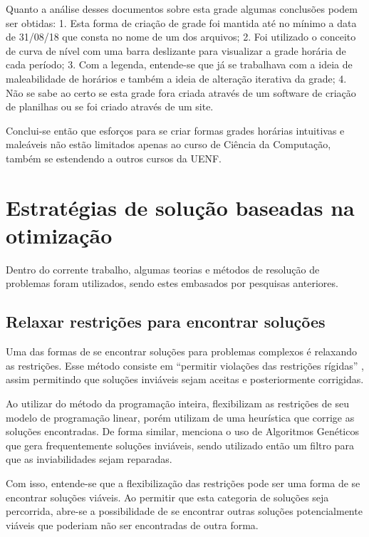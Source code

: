 Quanto a análise desses documentos sobre esta grade algumas conclusões podem ser obtidas: 1. Esta forma de criação de grade foi mantida até no mínimo a data de 31/08/18 que consta no nome de um dos arquivos; 2. Foi utilizado o conceito de curva de nível com uma barra deslizante para visualizar a grade horária de cada período; 3. Com a legenda, entende-se que já se trabalhava com a ideia de maleabilidade de horários e também a ideia de alteração iterativa da grade; 4. Não se sabe ao certo se esta grade fora criada através de um software de criação de planilhas ou se foi criado através de um site.

Conclui-se então que esforços para se criar formas grades horárias intuitivas e maleáveis não estão limitados apenas ao curso de Ciência da Computação, também se estendendo a outros cursos da UENF.

\section{Estratégias de solução baseadas na otimização} \label{sec:teorias}                               %

Dentro do corrente trabalho, algumas teorias e métodos de resolução de problemas foram utilizados, sendo estes embasados por pesquisas anteriores.

\subsection{Relaxar restrições para encontrar soluções} \label{ssec:relaxar}                              %

Uma das formas de se encontrar soluções para problemas complexos é relaxando as restrições. Esse método consiste em ``permitir violações das restrições rígidas'' \cite{Dunke2023}, assim permitindo que soluções inviáveis sejam aceitas e posteriormente corrigidas.

Ao utilizar do método da programação inteira,  flexibilizam as restrições de seu modelo de programação linear, porém utilizam de uma heurística que corrige as soluções encontradas. De forma similar,  menciona o uso de Algoritmos Genéticos que gera frequentemente soluções inviáveis, sendo utilizado então um filtro para que as inviabilidades sejam reparadas.

Com isso, entende-se que a flexibilização das restrições pode ser uma forma de se encontrar soluções viáveis. Ao permitir que esta categoria de soluções seja percorrida, abre-se a possibilidade de se encontrar outras soluções potencialmente viáveis que poderiam não ser encontradas de outra forma.

